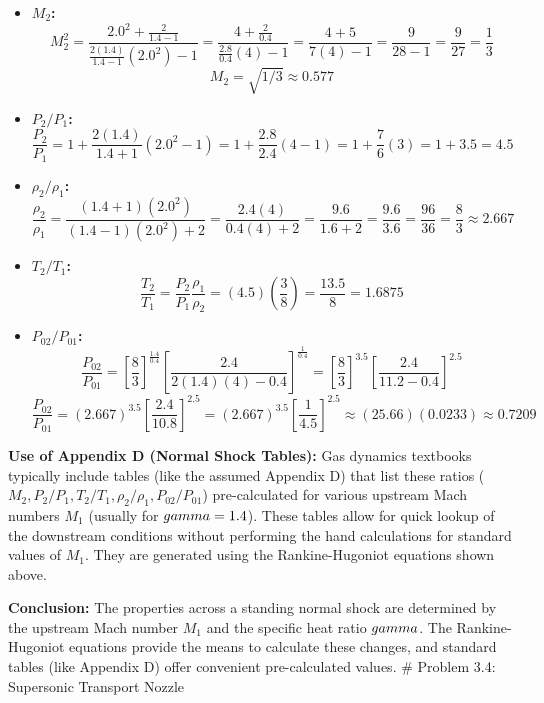 \begin{itemize}
\tightlist
\item
  \textbf{\(M_2\):}
  \[ M_2^2 = \frac{2.0^2 + \frac{2}{1.4 - 1}}{\frac{2(1.4)}{1.4 - 1}(2.0^2) - 1} = \frac{4 + \frac{2}{0.4}}{\frac{2.8}{0.4}(4) - 1} = \frac{4 + 5}{7(4) - 1} = \frac{9}{28 - 1} = \frac{9}{27} = \frac{1}{3} \]
  \[ M_2 = \sqrt{1/3} \approx 0.577 \]
\item
  \textbf{\(P_2/P_1\):}
  \[ \frac{P_2}{P_1} = 1 + \frac{2(1.4)}{1.4 + 1}(2.0^2 - 1) = 1 + \frac{2.8}{2.4}(4 - 1) = 1 + \frac{7}{6}(3) = 1 + 3.5 = 4.5 \]
\item
  \textbf{\(\rho_2/\rho_1\):}
  \[ \frac{\rho_2}{\rho_1} = \frac{(1.4 + 1)(2.0^2)}{(1.4 - 1)(2.0^2) + 2} = \frac{2.4(4)}{0.4(4) + 2} = \frac{9.6}{1.6 + 2} = \frac{9.6}{3.6} = \frac{96}{36} = \frac{8}{3} \approx 2.667 \]
\item
  \textbf{\(T_2/T_1\):}
  \[ \frac{T_2}{T_1} = \frac{P_2}{P_1} \frac{\rho_1}{\rho_2} = (4.5) \left( \frac{3}{8} \right) = \frac{13.5}{8} = 1.6875 \]
\item
  \textbf{\(P_{02}/P_{01}\):}
  \[ \frac{P_{02}}{P_{01}} = \left[ \frac{8}{3} \right]^{\frac{1.4}{0.4}} \left[ \frac{2.4}{2(1.4)(4) - 0.4} \right]^{\frac{1}{0.4}} = \left[ \frac{8}{3} \right]^{3.5} \left[ \frac{2.4}{11.2 - 0.4} \right]^{2.5} \]
  \[ \frac{P_{02}}{P_{01}} = (2.667)^{3.5} \left[ \frac{2.4}{10.8} \right]^{2.5} = (2.667)^{3.5} \left[ \frac{1}{4.5} \right]^{2.5} \approx (25.66)(0.0233) \approx 0.7209 \]
\end{itemize}

\textbf{Use of Appendix D (Normal Shock Tables):} Gas dynamics textbooks
typically include tables (like the assumed Appendix D) that list these
ratios (\(M_2, P_2/P_1, T_2/T_1, \rho_2/\rho_1, P_{02}/P_{01}\))
pre-calculated for various upstream Mach numbers \(M_1\) (usually for
\(\\gamma = 1.4\)). These tables allow for quick lookup of the
downstream conditions without performing the hand calculations for
standard values of \(M_1\). They are generated using the
Rankine-Hugoniot equations shown above.

\textbf{Conclusion:} The properties across a standing normal shock are
determined by the upstream Mach number \(M_1\) and the specific heat
ratio \(\\gamma\). The Rankine-Hugoniot equations provide the means to
calculate these changes, and standard tables (like Appendix D) offer
convenient pre-calculated values. \# Problem 3.4: Supersonic Transport
Nozzle

